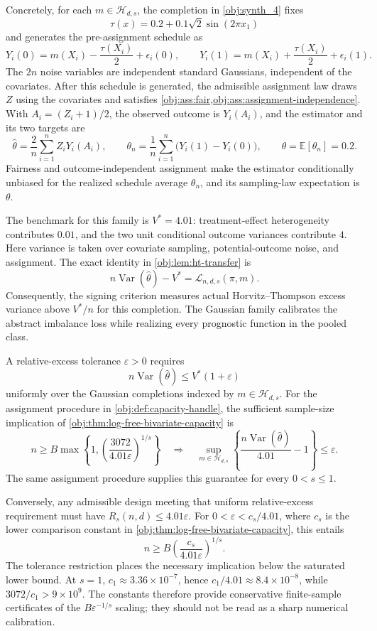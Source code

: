 Concretely, for each \(m\in\mathcal H_{d,s}\), the completion in \cref{obj:synth_4} fixes
\[
\tau(x)=0.2+0.1\sqrt2\sin(2\pi x_1)
\]
and generates the pre-assignment schedule as
\[
Y_i(0)=m(X_i)-\frac{\tau(X_i)}2+\epsilon_i(0),
\qquad
Y_i(1)=m(X_i)+\frac{\tau(X_i)}2+\epsilon_i(1).
\]
The \(2n\) noise variables are independent standard Gaussians, independent of the covariates. After this schedule is generated, the admissible assignment law draws \(Z\) using the covariates and satisfies \cref{obj:ass:fair,obj:ass:assignment-independence}. With \(A_i=(Z_i+1)/2\), the observed outcome is \(Y_i(A_i)\), and the estimator and its two targets are
\[
\widehat\theta=\frac2n\sum_{i=1}^n Z_iY_i(A_i),
\qquad
\theta_n=\frac1n\sum_{i=1}^n\bigl(Y_i(1)-Y_i(0)\bigr),
\qquad
\theta=\mathbb E[\theta_n]=0.2.
\]
Fairness and outcome-independent assignment make the estimator conditionally unbiased for the realized schedule average \(\theta_n\), and its sampling-law expectation is \(\theta\).

The benchmark for this family is \(V^*=4.01\): treatment-effect heterogeneity contributes \(0.01\), and the two unit conditional outcome variances contribute \(4\). Here variance is taken over covariate sampling, potential-outcome noise, and assignment. The exact identity in \cref{obj:lem:ht-transfer} is
\[
n\operatorname{Var}(\widehat\theta)-V^*
=
\mathcal L_{n,d,s}(\pi,m).
\]
Consequently, the signing criterion measures actual Horvitz--Thompson excess variance above \(V^*/n\) for this completion. The Gaussian family calibrates the abstract imbalance loss while realizing every prognostic function in the pooled class.

A relative-excess tolerance \(\varepsilon>0\) requires
\[
n\operatorname{Var}(\widehat\theta)
\leq V^*(1+\varepsilon)
\]
uniformly over the Gaussian completions indexed by \(m\in\mathcal H_{d,s}\). For the assignment procedure in \cref{obj:def:capacity-handle}, the sufficient sample-size implication of \cref{obj:thm:log-free-bivariate-capacity} is
\[
n\geq B\max\left\{
1,\left(\frac{3072}{4.01\varepsilon}\right)^{1/s}
\right\}
\quad\Longrightarrow\quad
\sup_{m\in\mathcal H_{d,s}}
\left\{
\frac{n\operatorname{Var}(\widehat\theta)}{4.01}-1
\right\}
\leq\varepsilon.
\]
The same assignment procedure supplies this guarantee for every \(0<s\leq1\).

Conversely, any admissible design meeting that uniform relative-excess requirement must have \(R_s(n,d)\leq4.01\varepsilon\). For \(0<\varepsilon<c_s/4.01\), where \(c_s\) is the lower comparison constant in \cref{obj:thm:log-free-bivariate-capacity}, this entails
\[
n\geq B\left(\frac{c_s}{4.01\varepsilon}\right)^{1/s}.
\]
The tolerance restriction places the necessary implication below the saturated lower bound. At \(s=1\), \(c_1\approx3.36\times10^{-7}\), hence \(c_1/4.01\approx8.4\times10^{-8}\), while \(3072/c_1>9\times10^9\). The constants therefore provide conservative finite-sample certificates of the \(B\varepsilon^{-1/s}\) scaling; they should not be read as a sharp numerical calibration.

